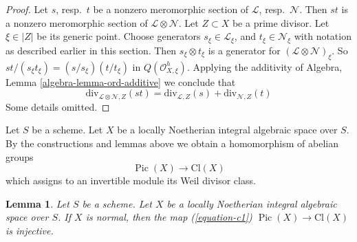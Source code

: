 \documentclass{stacks-project}
\theoremstyle{plain}
\newtheorem{lemma}[subsection]{Lemma}
\theoremstyle{definition}
\theoremstyle{remark}
\numberwithin{equation}{subsection}
\def\Pic{\mathop{\mathrm{Pic}}\nolimits}
\begin{document}
\begin{proof}
Let $s$, resp.\ $t$ be a nonzero meromorphic section
of $\mathcal{L}$, resp.\ $\mathcal{N}$. Then $st$ is a nonzero
meromorphic section of $\mathcal{L} \otimes \mathcal{N}$.
Let $Z \subset X$ be a prime divisor. Let $\xi \in |Z|$ be its generic
point. Choose generators $s_\xi \in \mathcal{L}_\xi$, and
$t_\xi \in \mathcal{N}_\xi$ with notation as described earlier
in this section. Then $s_\xi \otimes t_\xi$ is a generator
for $(\mathcal{L} \otimes \mathcal{N})_\xi$.
So $st/(s_\xi t_\xi) = (s/s_\xi)(t/t_\xi)$ in
$Q(\mathcal{O}_{X, \xi}^h)$. Applying the additivity of
Algebra, Lemma \ref{algebra-lemma-ord-additive}
we conclude that
$$
\text{div}_{\mathcal{L} \otimes \mathcal{N}, Z}(st)
=
\text{div}_{\mathcal{L}, Z}(s) + \text{div}_{\mathcal{N}, Z}(t)
$$
Some details omitted.
\end{proof}

\noindent
Let $S$ be a scheme. Let $X$ be a locally Noetherian integral algebraic space
over $S$. By the constructions and lemmas above we obtain a homomorphism
of abelian groups
\begin{equation}
\label{equation-c1}
\Pic(X) \longrightarrow \text{Cl}(X)
\end{equation}
which assigns to an invertible module its Weil divisor class.

\begin{lemma}
\label{lemma-normal-c1-injective}
Let $S$ be a scheme. Let $X$ be a locally Noetherian integral algebraic space
over $S$. If $X$ is normal, then the map (\ref{equation-c1})
$\Pic(X) \to \text{Cl}(X)$ is injective.
\end{lemma}
\end{document}
